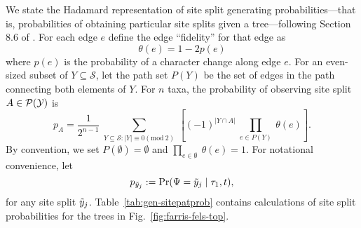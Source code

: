 We state the Hadamard representation of site split generating probabilities---that is, probabilities of obtaining particular site splits given a tree---following Section 8.6 of \citet{Semple2003-em}.
For each edge $e$ define the edge ``fidelity'' for that edge as
\[
\theta(e) = 1-2p(e)
\]
where $p(e)$ is the probability of a character change along edge $e$.
For an even-sized subset of $Y\subseteq\mathcal{S}$, let the path set $P(Y)$ be the set of edges in the path connecting both elements of $Y$.
For $n$ taxa, the probability of observing site split $A\in\mathcal{P}(\mathcal{Y})$ is
\begin{equation}
\label{eq:hadamard_probability}
p_A = \frac{1}{2^{n-1}} \ \sum_{Y \subseteq \mathcal{S} : |Y| \equiv 0 (\mathrm{mod} \ 2)} \ \left[(-1)^{|Y \cap A|} \ \prod_{e\in P(Y)} \ \theta(e) \right].
\end{equation}
By convention, we set $P(\emptyset)=\emptyset$ and $\prod_{e\in\emptyset} \ \theta(e) = 1$.
For notational convenience, let
\[
p_{\tilde{y}_j} := \Pr(\Psi=\tilde{y}_j \mid \tau_1,t),
\]
for any site split $\tilde{y}_j$.
Table~\ref{tab:gen-sitepatprob} contains calculations of site split probabilities for the trees in Fig.~\ref{fig:farris-fels-top}.

